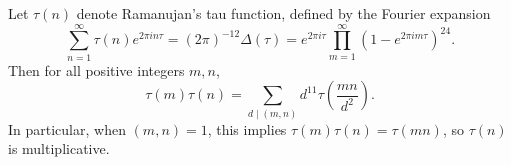 Let $\tau(n)$ denote Ramanujan's tau function, defined by the Fourier expansion
$$\sum_{n=1}^{\infty} \tau(n) e^{2\pi i n \tau} = (2\pi)^{-12} \Delta(\tau) = e^{2\pi i \tau} \prod_{m=1}^{\infty} (1 - e^{2\pi i m \tau})^{24}.$$
Then for all positive integers $m, n$,
$$\tau(m)\tau(n) = \sum_{d \mid (m,n)} d^{11} \tau\left(\frac{mn}{d^2}\right).$$
In particular, when $(m,n) = 1$, this implies $\tau(m)\tau(n) = \tau(mn)$, so $\tau(n)$ is multiplicative.
